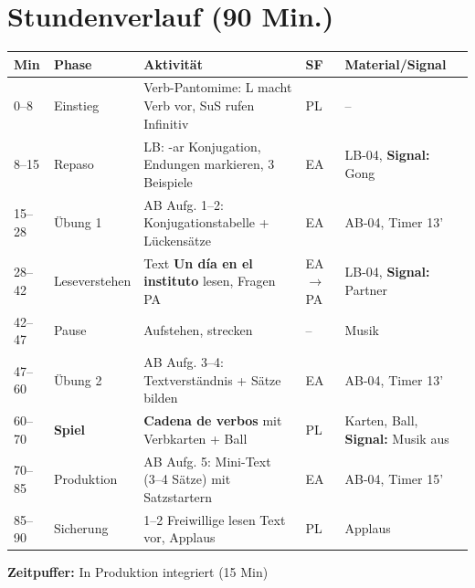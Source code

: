 \documentclass[11pt,a4paper]{article}
\newcommand{\es}[1]{\textbf{#1}}
\begin{document}
\vspace{0.5cm}

\section*{Stundenverlauf (90 Min.)}

\begin{tabular}{|p{1cm}|p{2.2cm}|p{5.8cm}|p{1cm}|p{3cm}|}
\hline
\textbf{Min} & \textbf{Phase} & \textbf{Aktivität} & \textbf{SF} & \textbf{Material/Signal} \\
\hline
0--8 & Einstieg & Verb-Pantomime: L macht Verb vor, SuS rufen Infinitiv & PL & -- \\
\hline
8--15 & Repaso & LB: -ar Konjugation, Endungen markieren, 3 Beispiele & EA & LB-04, \newline\textbf{Signal:} Gong \\
\hline
15--28 & Übung 1 & AB Aufg. 1--2: Konjugationstabelle + Lückensätze & EA & AB-04, Timer 13' \\
\hline
28--42 & Leseverstehen & Text \es{Un día en el instituto} lesen, Fragen PA & EA$\rightarrow$PA & LB-04, \newline\textbf{Signal:} Partner \\
\hline
42--47 & Pause & Aufstehen, strecken & -- & Musik \\
\hline
47--60 & Übung 2 & AB Aufg. 3--4: Textverständnis + Sätze bilden & EA & AB-04, Timer 13' \\
\hline
60--70 & \textbf{Spiel} & \es{Cadena de verbos} mit Verbkarten + Ball & PL & Karten, Ball, \newline\textbf{Signal:} Musik aus \\
\hline
70--85 & Produktion & AB Aufg. 5: Mini-Text (3--4 Sätze) mit Satzstartern & EA & AB-04, Timer 15' \\
\hline
85--90 & Sicherung & 1--2 Freiwillige lesen Text vor, Applaus & PL & Applaus \\
\hline
\end{tabular}

\vspace{0.3cm}
\textbf{Zeitpuffer:} In Produktion integriert (15 Min)

\vspace{0.5cm}

\end{document}
